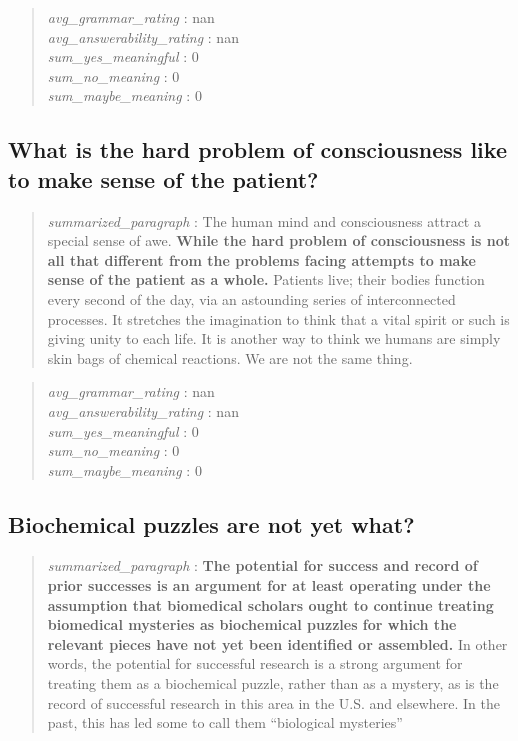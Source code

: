 \begin{quote}
\emph{avg\_grammar\_rating} : nan\\
\emph{avg\_answerability\_rating} : nan\\
\emph{sum\_yes\_meaningful} : 0\\
\emph{sum\_no\_meaning} : 0\\
\emph{sum\_maybe\_meaning} : 0
\end{quote}

\hypertarget{what-is-the-hard-problem-of-consciousness-like-to-make-sense-of-the-patient}{%
\subsection{What is the hard problem of consciousness like to make sense
of the
patient?}\label{what-is-the-hard-problem-of-consciousness-like-to-make-sense-of-the-patient}}

\begin{quote}
\emph{summarized\_paragraph} : The human mind and consciousness attract
a special sense of awe. \textbf{While the hard problem of consciousness
is not all that different from the problems facing attempts to make
sense of the patient as a whole.} Patients live; their bodies function
every second of the day, via an astounding series of interconnected
processes. It stretches the imagination to think that a vital spirit or
such is giving unity to each life. It is another way to think we humans
are simply skin bags of chemical reactions. We are not the same thing.
\end{quote}

\begin{quote}
\emph{avg\_grammar\_rating} : nan\\
\emph{avg\_answerability\_rating} : nan\\
\emph{sum\_yes\_meaningful} : 0\\
\emph{sum\_no\_meaning} : 0\\
\emph{sum\_maybe\_meaning} : 0
\end{quote}

\hypertarget{biochemical-puzzles-are-not-yet-what}{%
\subsection{Biochemical puzzles are not yet
what?}\label{biochemical-puzzles-are-not-yet-what}}

\begin{quote}
\emph{summarized\_paragraph} : \textbf{The potential for success and
record of prior successes is an argument for at least operating under
the assumption that biomedical scholars ought to continue treating
biomedical mysteries as biochemical puzzles for which the relevant
pieces have not yet been identified or assembled.} In other words, the
potential for successful research is a strong argument for treating them
as a biochemical puzzle, rather than as a mystery, as is the record of
successful research in this area in the U.S. and elsewhere. In the past,
this has led some to call them ``biological mysteries''
\end{quote}


